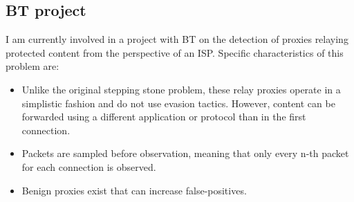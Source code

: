 \documentclass[a4paper,12pt,twoside]{article}
\begin{document}
\subsection{BT project}\label{Bla}






I am currently involved in a project with BT on the detection of proxies relaying protected content from the perspective of an ISP. Specific characteristics of this problem are:

\begin{itemize}
\item Unlike the original stepping stone problem, these relay proxies operate in a simplistic fashion and do not use evasion tactics. However, content can be forwarded using a different application or protocol than in the first connection.
\item Packets are sampled before observation, meaning that only every n-th packet for each connection is observed.
\item Benign proxies exist that can increase false-positives.
\end{itemize}
\end{document}
